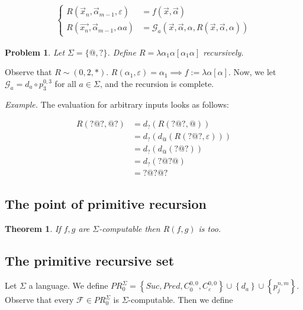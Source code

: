 \documentclass[a4paper, 12pt]{article}
\newtheorem{problem}{Problem}
\newtheorem{theorem}{Theorem}
\newtheorem{problem}{Problem}
\newtheorem{theorem}{Theorem}
\begin{document}
\begin{align*}
    \begin{cases}
        R(\overrightarrow{x}_n, \overrightarrow{\alpha}_{m-1}, \varepsilon) &=
        f(\overrightarrow{x}, \overrightarrow{\alpha}) \\ 
        R(\overrightarrow{x_n}, \overrightarrow{\alpha}_{m-1}, \alpha a)&= \mathcal{G}_a
        \left( \overrightarrow{x}, \overrightarrow{\alpha},
        \alpha, R(\overrightarrow{x}, \overrightarrow{\alpha}, \alpha) \right) 
    \end{cases}
\end{align*}

\begin{problem}
    Let $\Sigma = \{ @, ? \}$. Define $R = \lambda \alpha_1 \alpha [ \alpha_1
    \alpha ]$ recursively.
\end{problem}

Observe that $R \sim (0, 2, *)$. $R(\alpha_1, \varepsilon) = \alpha_1 \implies f :=
\lambda \alpha[\alpha]$. Now, we let $\mathcal{G}_{a} = d_a \circ p_{3}^{0, 3}$
for all $a \in \Sigma$, and the recursion is complete.

\textit{Example.} The evaluation for arbitrary inputs looks as follows:

\begin{align*}
    R(?@?, @?) &= d_? \left( R(?@?, @) \right)  \\ 
               &= d_? \left( d_@ \left( R(?@?, \varepsilon) \right)  \right)  \\ 
               &= d_? \left(  d_@ \left( ?@? \right)  \right)  \\ 
               &= d_? \left( ?@?@ \right) \\ 
               &= ?@?@?
\end{align*}

\subsection{The point of primitive recursion}

\begin{theorem}
    If $f, g$ are $\Sigma$-computable then $R(f, g)$ is too.
\end{theorem}

\subsection{The primitive recursive set}

Let $\Sigma$ a language. We define $PR_0^{\Sigma} = \left\{ Suc, Pred, C_0^{0,
0}, C_{\varepsilon}^{0, 0} \right\} \cup \left\{ d_a \right\} \cup \left\{ p_j^{n,
m} \right\}  $. Observe that every $\mathcal{F} \in PR_0^{\Sigma}$ is
$\Sigma$-computable. Then we define 
\end{document}
